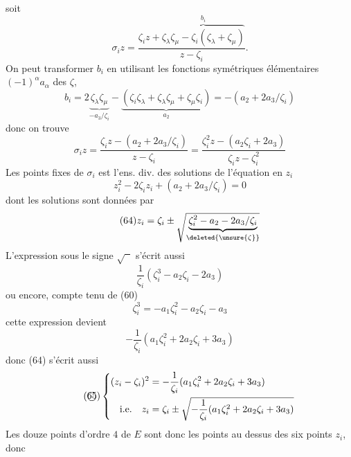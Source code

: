 soit
\[
\tag{61}
\sigma_i z=\frac{\zeta_i z+\overbrace{\zeta_\lambda\zeta_\mu-\zeta_i(\zeta_\lambda+\zeta_\mu)}^{b_i}}{z-\zeta_i}.
\]
On peut transformer $b_i$ en utilisant les fonctions symétriques élémentaires $(-1)^\alpha a_\alpha$ des $\zeta$,
\[
b_i=2\underbrace{\zeta_\lambda\zeta_\mu}_{-a_3/\zeta_i}-\underbrace{(\zeta_i\zeta_\lambda+\zeta_\lambda\zeta_\mu+\zeta_\mu\zeta_i)}_{a_2}=-(a_2+2a_3/\zeta_i)
\]
donc on trouve
\[
\tag{62}
\sigma_i z=\frac{\zeta_i z-(a_2+2a_3/\zeta_i)}{z-\zeta_i}=\frac{\zeta_i^2z-(a_2\zeta_i+2a_3)}{\zeta_i z-\zeta_i^2}
\]
Les  points fixes de $\sigma_i$ est l'ens. div. des solutions de l'équation en $z_i$
\[
\tag{63}
z_i^2-2\zeta_i z_i+(a_2+2a_3/\zeta_i)=0
\]
dont les solutions sont données par
\[
\tag{64}
z_i=\zeta_i\pm\sqrt{\underbrace{\zeta_i^2-a_2-2a_3/\zeta_i}_{\deleted{\unsure{\zeta}}}}
\]
L'expression sous le signe $\sqrt{\phantom{x}}$ s'écrit aussi
\[
\frac{1}{\zeta_i}(\zeta_i^3-a_2\zeta_i-2a_3)
\]
ou encore, compte tenu de (60)
\[
\zeta_i^3=-a_1\zeta_i^2-a_2\zeta_i-a_3
\]
 cette expression devient
\[
-\frac{1}{\zeta_i}(a_1\zeta_i^2+2a_2\zeta_i+3a_3)
\]
donc (64) s'écrit aussi
\[
\tag{\textcircled{65}}
\left\{\begin{aligned}
(z_i-\zeta_i)^2&=-\frac{1}{\zeta_i}(a_1\zeta_i^2+2a_2\zeta_i+3a_3)\\
\text{i.e.}\quad z_i&=\zeta_i\pm\sqrt{-\frac{1}{\zeta_i}(a_1\zeta_i^2+2a_2\zeta_i+3a_3)}
\end{aligned}\right.
\]
Les douze points d'ordre $4$ de $E$ sont donc les points au dessus des six points $z_i$, donc  
